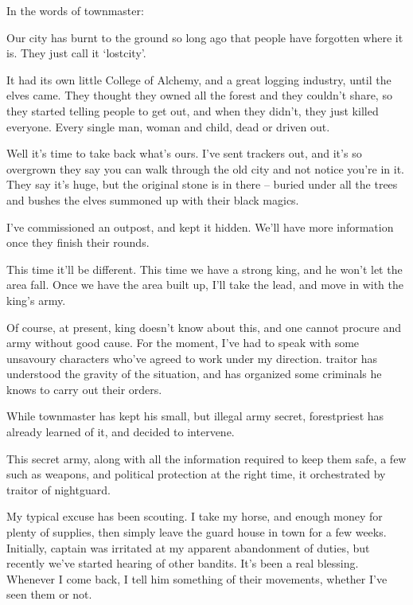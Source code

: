 \begin{multicols}{2}
\label{expanding_wilderness}

\noindent
In the words of \gls{townmaster}:

\begin{exampletext}

	Our city has burnt to the ground so long ago that people have forgotten where it is.
	They just call it `\gls{lostcity}'.

	It had its own little College of Alchemy, and a great logging industry, until the elves came.
	They thought they owned all the forest and they couldn't share, so they started telling people to get out, and when they didn't, they just killed everyone.
	Every single man, woman and child, dead or driven out.

	Well it's time to take back what's ours.
	I've sent trackers out, and it's so overgrown they say you can walk through the old city and not notice you're in it.
	They say it's huge, but the original stone is in there -- buried under all the trees and bushes the elves summoned up with their black magics.

	I've commissioned an outpost, and kept it hidden.
	We'll have more information once they finish their rounds.

	This time it'll be different.
	This time we have a strong king, and he won't let the area fall.
	Once we have the area built up, I'll take the lead, and move in with the king's army.

	Of course, at present, \gls{king} doesn't know about this, and one cannot procure and army without good cause.
	For the moment, I've had to speak with some unsavoury characters who've agreed to work under my direction.
	\Gls{traitor} has understood the gravity of the situation, and has organized some criminals he knows to carry out their orders.

\end{exampletext}

While \gls{townmaster} has kept his small, but illegal army secret, \gls{forestpriest} has already learned of it, and decided to intervene.

This secret army, along with all the information required to keep them safe, a few such as weapons, and political protection at the right time, it orchestrated by \gls{traitor} of \gls{nightguard}.

\begin{exampletext}

	My typical excuse has been scouting.
	I take my horse, and enough money for plenty of supplies, then simply leave the guard house in \gls{town} for a few weeks.
	Initially, \gls{captain} was irritated at my apparent abandonment of duties, but recently we've started hearing of other bandits.
	It's been a real blessing.
	Whenever I come back, I tell him something of their movements, whether I've seen them or not.


\end{exampletext}
\end{multicols}
